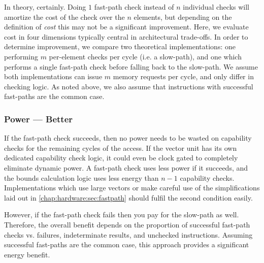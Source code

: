 In theory, certainly.
Doing $1$ fast-path check instead of $n$ individual checks will amortize the cost of the check over the $n$ elements, but depending on the definition of \emph{cost} this may not be a significant improvement.
Here, we evaluate cost in four dimensions typically central in architectural trade-offs.
In order to determine improvement, we compare two theoretical implementations: one performing $m$ per-element checks per cycle (i.e. a slow-path), and one which performs a single fast-path check before falling back to the slow-path.
We assume both implementations can issue $m$ memory requests per cycle, and only differ in checking logic.
As noted above, we also assume that instructions with successful fast-paths are the common case.


\subsubsection*{Power --- Better}
If the fast-path check succeeds, then no power needs to be wasted on capability checks for the remaining cycles of the access.
If the vector unit has its own dedicated capability check logic, it could even be clock gated to completely eliminate dynamic power.
A fast-path check uses less power if it succeeds, and the bounds calculation logic uses less energy than $n - 1$ capability checks.
Implementations which use large vectors or make careful use of the simplifications laid out in \cref{chap:hardware:sec:fastpath} should fulfil the second condition easily.

However, if the fast-path check fails then you pay for the slow-path as well.
Therefore, the overall benefit depends on the proportion of successful fast-path checks vs. failures, indeterminate results, and unchecked instructions.
Assuming successful fast-paths are the common case, this approach provides a significant energy benefit.

